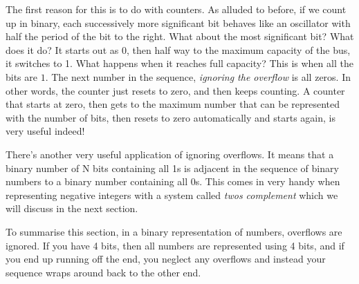 \documentclass[../physical_computing.tex]{subfiles}
\begin{document}
The first reason for this is to do with counters. As alluded to before, if we count up in binary, each successively more significant bit behaves like an oscillator with half the period of the bit to the right. What about the most significant bit? What does it do? It starts out as 0, then half way to the maximum capacity of the bus, it switches to 1. What happens when it reaches full capacity? This is when all the bits are $1$. The next number in the sequence, {\it ignoring the overflow} is all zeros. In other words, the counter just resets to zero, and then keeps counting. A counter that starts at zero, then gets to the maximum number that can be represented with the number of bits, then resets to zero automatically and starts again, is very useful indeed!

There's another very useful application of ignoring overflows. It means that a binary number of N bits containing all 1s is adjacent in the sequence of binary numbers to a binary number containing all 0s. This comes in very handy when representing negative integers with a system called {\it twos complement} which we will discuss in the next section.

To summarise this section, in a binary representation of numbers, overflows are ignored. If you have 4 bits, then all numbers are represented using 4 bits, and if you end up running off the end, you neglect any overflows and instead your sequence wraps around back to the other end.
\end{document}
